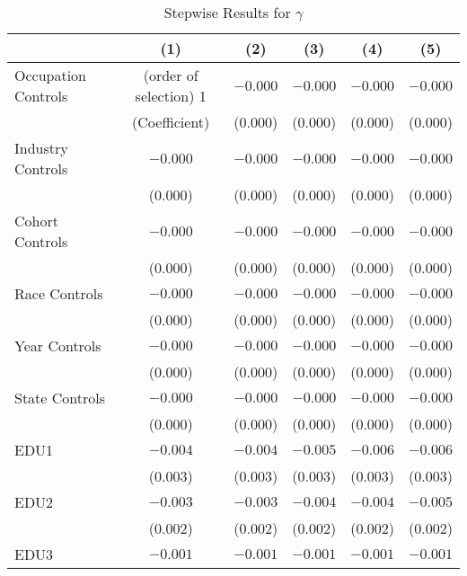 \documentclass[12pt]{article}
\begin{document}
\begin{table}[ht]
\centering
\caption{Stepwise Results for $\gamma$}



\begin{tabular}{lccccc}


\toprule
                    & (1)     & (2)   & (3)    & (4)      & (5)         \\
\midrule
Occupation Controls      & (order of selection) 1  & $-0.000$    & $-0.000$  & $-0.000$   & $-0.000$    \\
                    & (Coefficient)   & (0.000)     & (0.000)   & (0.000)    & (0.000)     \\
Industry Controls      & $-0.000$  & $-0.000$    & $-0.000$  & $-0.000$   & $-0.000$    \\
                    & (0.000)   & (0.000)     & (0.000)   & (0.000)    & (0.000)     \\
Cohort Controls      & $-0.000$  & $-0.000$    & $-0.000$  & $-0.000$   & $-0.000$    \\
                    & (0.000)   & (0.000)     & (0.000)   & (0.000)    & (0.000)     \\
Race Controls      & $-0.000$  & $-0.000$    & $-0.000$  & $-0.000$   & $-0.000$    \\
                    & (0.000)   & (0.000)     & (0.000)   & (0.000)    & (0.000)     \\
Year Controls      & $-0.000$  & $-0.000$    & $-0.000$  & $-0.000$   & $-0.000$    \\
                    & (0.000)   & (0.000)     & (0.000)   & (0.000)    & (0.000)     \\
State Controls      & $-0.000$  & $-0.000$    & $-0.000$  & $-0.000$   & $-0.000$    \\
                    & (0.000)   & (0.000)     & (0.000)   & (0.000)    & (0.000)     \\
EDU1                & $-0.004$  & $-0.004$    & $-0.005$  & $-0.006$   & $-0.006$    \\
                    & (0.003)   & (0.003)     & (0.003)   & (0.003)    & (0.003)     \\
EDU2                & $-0.003$  & $-0.003$    & $-0.004$  & $-0.004$   & $-0.005$    \\
                    & (0.002)   & (0.002)     & (0.002)   & (0.002)    & (0.002)     \\
EDU3                & $-0.001$  & $-0.001$    & $-0.001$  & $-0.001$   & $-0.001$    \\

\end{tabular}
\end{table}
\end{document}
